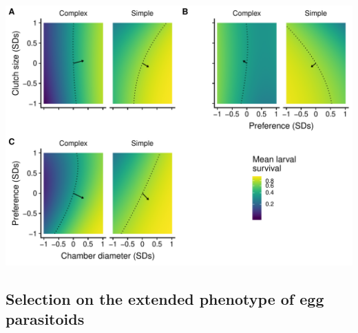\documentclass[11pt,]{article}
\let\origfigure\figure
\let\endorigfigure\endfigure
\renewenvironment{figure}[1][2] {
    \expandafter\origfigure\expandafter[H]
} {
    \endorigfigure
}
\begin{document}
\begin{figure}
\centering
\includegraphics{analyses/MV_landscapes.pdf}
\caption{\label{fig:MV_Landscape}Two dimensional view of adaptive
landscapes of gall midge phenotypes in complex vs.~simple food webs.
Each panel corresponds to a different combination of phenotypic traits:
clutch size and chamber diameter (A); clutch size and oviposition
preference (B); oviposition preference and chamber diameter (C). Arrows
represent mean estimates of directional selection gradients, while
contours represent predicted larval survival of the mean phenotype
(i.e., all traits = 0) in each food-web treatment. Notice that arrows
point more toward a corner of the adaptive landscape for each
combination of traits in the simple vs.~complex food-web treatment. This
indicates that trait integration (covariance) is more strongly favored
in simpler vs.~more complex food webs. Note that mean larval survival is
plotted on a natural log scale to reflect the mathematical definition of
the adaptive landscape.}
\end{figure}

\subsection{Selection on the extended phenotype of egg
parasitoids}\label{selection-on-the-extended-phenotype-of-egg-parasitoids}
\end{document}
